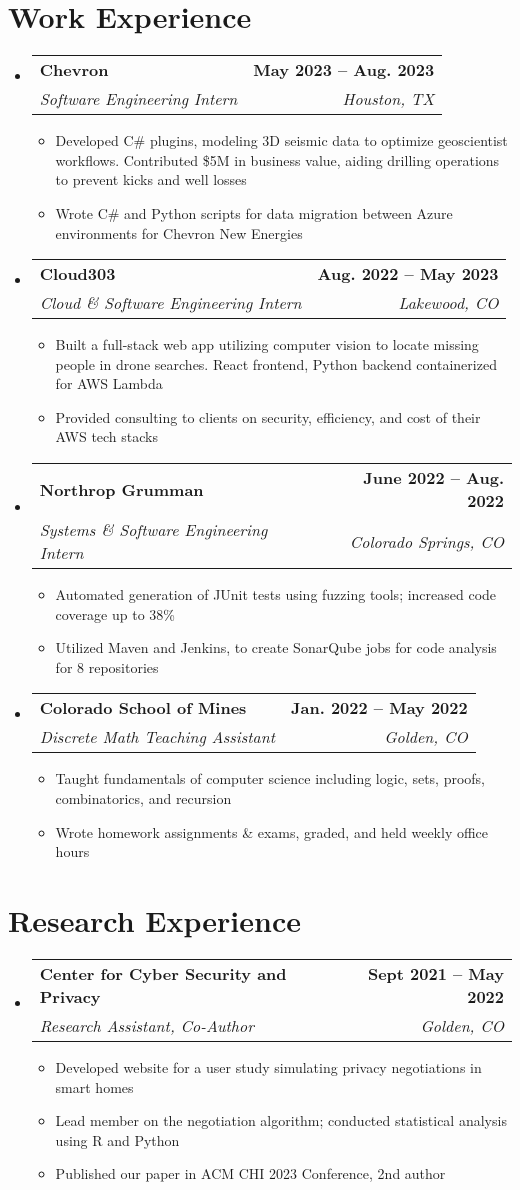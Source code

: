 \documentclass[11pt, letterpaper]{article}
\makeatletter
\newcommand{\resumeItem}[1]{
  \item\small{
    {#1 \vspace{-2pt}}
  }
}
\newcommand{\resumeSubheading}[4]{
  \vspace{-2pt}\item
    \begin{tabular*}{1.0\textwidth}[t]{l@{\extracolsep{\fill}}r}
      \textbf{#1} & \textbf{\small #2} \\
      \textit{\small#3} & \textit{\small #4} \\
    \end{tabular*}\vspace{-7pt}
}
\newcommand{\resumeSubHeadingListStart}{\begin{itemize}[leftmargin=0.0in, label={}]}
\newcommand{\resumeSubHeadingListEnd}{\end{itemize}}
\newcommand{\resumeItemListStart}{\begin{itemize}}
\newcommand{\resumeItemListEnd}{\end{itemize}\vspace{-5pt}}
\makeatother
\begin{document}
\section{Work Experience}   %
  \resumeSubHeadingListStart
    \resumeSubheading
      {Chevron}{May 2023 -- Aug. 2023}
      {Software Engineering Intern}{Houston, TX}
      \resumeItemListStart
        \resumeItem{
          Developed C\# plugins, modeling 3D seismic data to optimize geoscientist workflows. 
          Contributed \$5M in business value, aiding drilling operations to prevent kicks and well losses}
        \resumeItem{Wrote C\# and Python scripts for data migration between Azure environments for Chevron New Energies}
    \resumeItemListEnd
      
    \resumeSubheading
      {Cloud303}{Aug. 2022 -- May 2023}
      {Cloud \& Software Engineering Intern}{Lakewood, CO}
      \resumeItemListStart
        \resumeItem{Built a full-stack web app utilizing computer vision to locate missing people in drone searches. React frontend, Python backend containerized for AWS Lambda}
        \resumeItem{Provided consulting to clients on security, efficiency, and cost of their AWS tech stacks}
    \resumeItemListEnd
    
    \resumeSubheading
      {Northrop Grumman}{June 2022 -- Aug. 2022}
      {Systems \& Software Engineering Intern}{Colorado Springs, CO}
      \resumeItemListStart
        \resumeItem{Automated generation of JUnit tests using fuzzing tools; increased code coverage up to 38\%}
        \resumeItem{Utilized Maven and Jenkins, to create SonarQube jobs for code analysis for 8 repositories}
    \resumeItemListEnd

    \resumeSubheading
    {Colorado School of Mines}{Jan. 2022 -- May 2022}
    {Discrete Math Teaching Assistant}{Golden, CO}
    \resumeItemListStart
      \resumeItem{Taught fundamentals of computer science including logic, sets, proofs, combinatorics, and recursion}
      \resumeItem{Wrote homework assignments \& exams, graded, and held weekly office hours}
    \resumeItemListEnd
    
  \resumeSubHeadingListEnd

\section{Research Experience}   %
  \resumeSubHeadingListStart
    \resumeSubheading
      {Center for Cyber Security and Privacy}{Sept 2021 -- May 2022}
      {Research Assistant, Co-Author}{Golden, CO}
      \resumeItemListStart
        \resumeItem{Developed website for a user study simulating privacy negotiations in smart homes}
        \resumeItem{Lead member on the negotiation algorithm; conducted statistical analysis using R and Python}
        \resumeItem{Published our paper in ACM CHI 2023 Conference, 2nd author}
    \resumeItemListEnd
  \resumeSubHeadingListEnd
\end{document}
